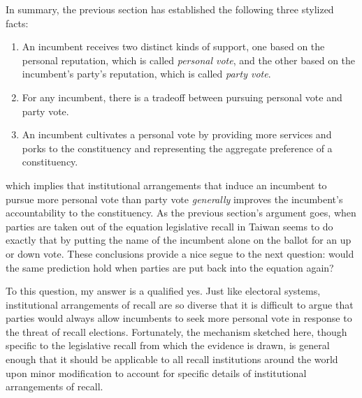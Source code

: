 \documentclass[hyphens, crop=false]{standalone}
\begin{document}
	
	
	
	
	
	
	In summary,
	the previous section has established the following
	three stylized facts:
	\begin{enumerate}
		\item
		An incumbent receives
		two distinct kinds of support,
		one based on the personal reputation, which is called \textit{personal vote}, and
		the other based on the incumbent's party's reputation, which is called \textit{party vote}.
		\item
		For any incumbent, there is a tradeoff between pursuing personal vote and party vote.
		\item
		An incumbent cultivates a personal vote
		by providing more services and porks to the constituency and
		representing the aggregate preference of a constituency.
	\end{enumerate}
	which implies that
	institutional arrangements that induce an incumbent to pursue more personal vote than party vote
	\textit{generally} improves the incumbent's accountability to the constituency.
	As the previous section's argument goes,
	when parties are taken out of the equation
	legislative recall in Taiwan seems to do exactly that
	by putting the name of the incumbent alone on the ballot for an up or down vote.
	These conclusions provide a nice segue to the next question:
	would the same prediction hold when parties are put back into the equation again?
	
	To this question,
	my answer is a qualified yes.
	Just like electoral systems,
	institutional arrangements of recall are so diverse that it is difficult to
	argue that parties would always allow incumbents to seek more personal vote
	in response to the threat of recall elections.
	Fortunately,
	the mechanism sketched here,
	though specific to the legislative recall
	from which the evidence is drawn,
	is general enough
	that it should be applicable to all recall institutions around the world
	upon minor modification to account for specific details of institutional arrangements of recall.
	
\end{document}
